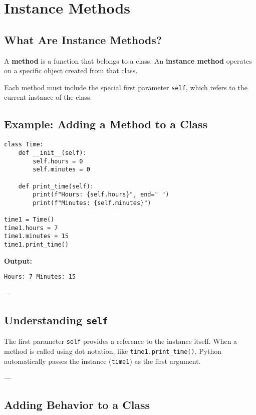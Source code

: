 \chapter{Instance Methods}

\section{What Are Instance Methods?}

A \textbf{method} is a function that belongs to a class.  
An \textbf{instance method} operates on a specific object created from that class.

Each method must include the special first parameter \texttt{self}, which refers to the current instance of the class.

\section{Example: Adding a Method to a Class}

\begin{verbatim}
class Time:
    def __init__(self):
        self.hours = 0
        self.minutes = 0

    def print_time(self):
        print(f"Hours: {self.hours}", end=" ")
        print(f"Minutes: {self.minutes}")

time1 = Time()
time1.hours = 7
time1.minutes = 15
time1.print_time()
\end{verbatim}

\textbf{Output:}
\begin{verbatim}
Hours: 7 Minutes: 15
\end{verbatim}

---

\section{Understanding \texttt{self}}

The first parameter \texttt{self} provides a reference to the instance itself.  
When a method is called using dot notation, like \texttt{time1.print\_time()},  
Python automatically passes the instance (\texttt{time1}) as the first argument.

---

\section{Adding Behavior to a Class}

